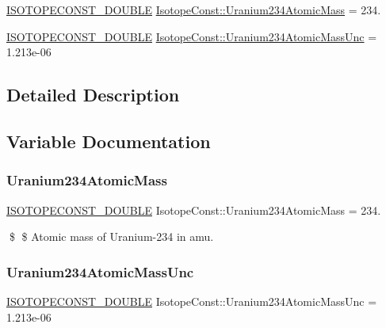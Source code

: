 \begin{DoxyCompactItemize}
\item 
\mbox{\hyperlink{group___isotope_const-_macros_ga8f45a7272ce02c0b4c65c44636ed719a}{I\+S\+O\+T\+O\+P\+E\+C\+O\+N\+S\+T\+\_\+\+D\+O\+U\+B\+LE}} \mbox{\hyperlink{group___isotope_const-_uranium-_u234_gafb506ba5d4214fc52824f3e661ac0d7d}{Isotope\+Const\+::\+Uranium234\+Atomic\+Mass}} = 234.
\item 
\mbox{\hyperlink{group___isotope_const-_macros_ga8f45a7272ce02c0b4c65c44636ed719a}{I\+S\+O\+T\+O\+P\+E\+C\+O\+N\+S\+T\+\_\+\+D\+O\+U\+B\+LE}} \mbox{\hyperlink{group___isotope_const-_uranium-_u234_ga8f4f980712dfffcb6a75c2f529dfb3b7}{Isotope\+Const\+::\+Uranium234\+Atomic\+Mass\+Unc}} = 1.\+213e-\/06
\end{DoxyCompactItemize}


\subsection{Detailed Description}


\subsection{Variable Documentation}
\mbox{\label{group___isotope_const-_uranium-_u234_gafb506ba5d4214fc52824f3e661ac0d7d}} 
\subsubsection{\texorpdfstring{Uranium234\+Atomic\+Mass}{Uranium234AtomicMass}}
{\footnotesize\ttfamily \mbox{\hyperlink{group___isotope_const-_macros_ga8f45a7272ce02c0b4c65c44636ed719a}{I\+S\+O\+T\+O\+P\+E\+C\+O\+N\+S\+T\+\_\+\+D\+O\+U\+B\+LE}} Isotope\+Const\+::\+Uranium234\+Atomic\+Mass = 234.}

\$ \$ Atomic mass of Uranium-\/234 in amu. \mbox{\label{group___isotope_const-_uranium-_u234_ga8f4f980712dfffcb6a75c2f529dfb3b7}} 
\subsubsection{\texorpdfstring{Uranium234\+Atomic\+Mass\+Unc}{Uranium234AtomicMassUnc}}
{\footnotesize\ttfamily \mbox{\hyperlink{group___isotope_const-_macros_ga8f45a7272ce02c0b4c65c44636ed719a}{I\+S\+O\+T\+O\+P\+E\+C\+O\+N\+S\+T\+\_\+\+D\+O\+U\+B\+LE}} Isotope\+Const\+::\+Uranium234\+Atomic\+Mass\+Unc = 1.\+213e-\/06}

